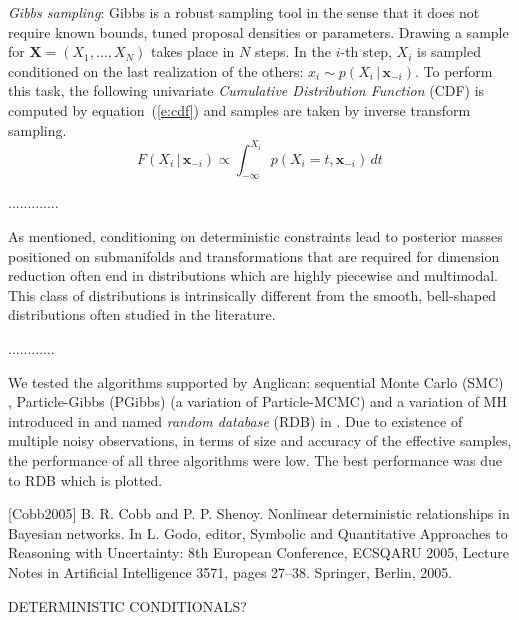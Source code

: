 \documentclass{article}
\newcommand{\bvec}[1]{\textbf{#1}}
\newcommand{\pr}{p}
\begin{document}
{\emph{Gibbs sampling}:
Gibbs is a robust sampling tool in the sense that it does not require known bounds, tuned proposal densities or parameters.
Drawing a sample for $\bvec{X} = (X_1, \ldots, X_N)$ takes place in $N$ steps.
In the $i$-th step, $X_i$ is sampled conditioned on the last realization of the others:
$x_i \sim \pr(X_i \,|\, \bvec{x}_{-i})$. 
To perform this task, the following univariate \emph{Cumulative Distribution Function} (CDF)
is computed by equation~(\ref{e:cdf}) and samples are taken by inverse transform sampling. 
{\footnotesize
\begin{equation}
\label{e:cdf}
F(X_i  \,|\, \bvec{x}_{-i}) 
\propto
\int_{-\infty}^{X_i} \!\!\!\! \pr(X_i = t, \bvec{x}_{-i}) \, d  t
\end{equation} 
}

.............

{\color{green}As mentioned, conditioning on deterministic constraints lead to posterior masses positioned  on submanifolds and transformations that are required for dimension reduction
often end in distributions which are highly piecewise and multimodal.
This class of distributions is intrinsically different from the smooth, bell-shaped distributions often studied in the literature. }

............

We tested the algorithms supported by Anglican:
 sequential
Monte Carlo (SMC) \cite{wood2014new},
Particle-Gibbs (PGibbs) (a variation of Particle-MCMC\cite{andrieu2010particle}) 
and a variation of MH introduced in \cite{wingate2011lightweight} and named \emph{random database} (RDB) in \cite{wood2014new}.
Due to existence of multiple noisy observations, in terms of size and accuracy of the effective samples, the performance of all three algorithms were low. The best performance was due to RDB which is plotted. 
 

}%
{
\color{red}
[Cobb2005] B. R. Cobb and P. P. Shenoy. Nonlinear deterministic relationships in Bayesian networks.
In L. Godo, editor, Symbolic and Quantitative Approaches to Reasoning with
Uncertainty: 8th European Conference, ECSQARU 2005, Lecture Notes in Artificial
Intelligence 3571, pages 27–38. Springer, Berlin, 2005.

DETERMINISTIC CONDITIONALS?

}
\end{document}
